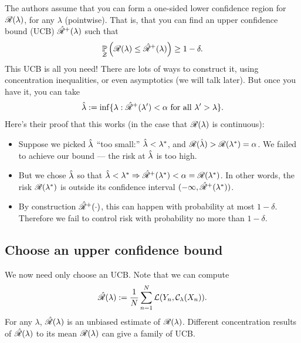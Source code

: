 \documentclass[twoside,11pt]{article}
\numberwithin{equation}{section}
\begin{document}
The authors assume that you can form a one-sided lower confidence region for
$\mathscr{R}(\lambda)$, for any $\lambda$ (pointwise).  That is, that you can find an
upper confidence bound (UCB) $\hat{\mathscr{R}}^{+}(\lambda)$ such that
%
\begin{align*}
%
\p{\calset}{\risk(\lambda) \le \rupper(\lambda)} \ge 1 - \delta.
%
\end{align*}
%
This UCB is all you need!  There are lots of ways to construct it, using
concentration inequalities, or even asymptotics (we will talk later).  But once
you have it, you can take
%
\begin{align*}
%
\lambdahat := \inf\{\lambda: \rupper(\lambda') < \alpha
\textrm{ for all }\lambda' > \lambda \}.
%
\end{align*}
%
Here's their proof that this works (in the case that $\mathscr{R}(\lambda)$
is continuous):
%
\begin{itemize}
    \item Suppose we picked $\hat{\lambda}$ ``too small:'' $\hat{\lambda} <
    \lambda^{*}$, and $\mathscr{R}(\hat{\lambda}) > \mathscr{R}(\lambda^{*}) = \alpha$.  We
    failed to achieve our bound --- the risk at $\hat{\lambda}$ is too high.
    \item But we chose $\hat{\lambda}$ so that $\hat{\lambda} < \lambda^{*}
    \Rightarrow \hat{\mathscr{R}}^{+}(\lambda^{*}) < \alpha = \mathscr{R}(\lambda^{*})$. In other
    words, the risk $\mathscr{R}(\lambda^{*})$ is outside its confidence interval
    $(-\infty, \hat{\mathscr{R}}^{+}(\lambda^{*}))$.
    \item By construction $\hat{\mathscr{R}}^{+}(\cdot)$, this can happen with
    probability at most $1 - \delta$.  Therefore we fail to control
    risk with probability no more than $1-\delta$.
\end{itemize}


\subsection{Choose an upper confidence bound} 

We now need only choose an UCB.  Note that we can compute
%
\begin{align*}
%
\riskhat(\lambda) := \meann \loss(\y_n, \cfun_\lambda(\x_n)).
%
\end{align*}
%
For any $\lambda$, $\hat{\mathscr{R}}(\lambda)$ is an unbiased estimate of
$\mathscr{R}(\lambda)$.  Different concentration results of $\hat{\mathscr{R}}(\lambda)$ to its
mean $\mathscr{R}(\lambda)$ can give a family of UCB.
\end{document}
